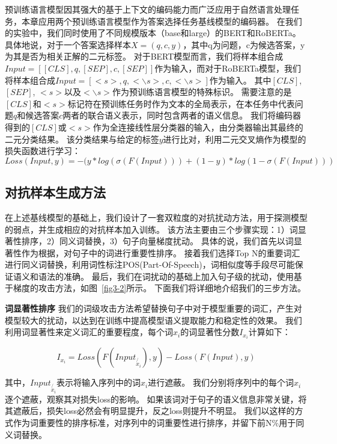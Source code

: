 预训练语言模型因其强大的基于上下文的编码能力而广泛应用于自然语言处理任务，本章应用两个预训练语言模型作为答案选择任务基线模型的编码器。
在我们的实验中，我们同时使用了不同规模版本（base和large）的BERT\cite{devlin2018bert}和RoBERTa\cite{liu2019roberta}。
具体地说，对于一个答案选择样本$X=(q, c, y)$，其中q为问题，c为候选答案，y为其是否为相关正解的二元标签。
对于BERT模型而言，我们将样本组合成$Input = [[CLS], q, [SEP], c, [SEP]]$作为输入，而对于RoBERTa模型，我们将样本组合成$Input = [<s>, q, <\backslash s>, c, <\backslash s>]$作为输入。
其中$[CLS]$, $[SEP]$, $<s>$以及$<\backslash s>$作为预训练语言模型的特殊标识。
需要注意的是$[CLS]$和$<s>$标记符在预训练任务时作为文本的全局表示，在本任务中代表问题$q$和候选答案$c$两者的联合语义表示，同时包含两者的语义信息。
我们将编码器得到的$[CLS]$或$<s>$作为全连接线性层分类器的输入，由分类器输出其最终的二元分类结果。
该分类结果与给定的标签$y$进行比对，利用二元交叉熵作为模型的损失函数进行学习：
\begin{equation}
    Loss(Input, y) = -(y * log(\sigma(F(Input))) + (1 - y) * log(1 - \sigma(F(Input)))
\end{equation}


\subsection{对抗样本生成方法}
在上述基线模型的基础上，我们设计了一套双粒度的对抗扰动方法，用于探测模型的弱点，并生成相应的对抗样本加入训练。
该方法主要由三个步骤实现：1）词显著性排序，2）同义词替换，3）句子向量梯度扰动。
具体的说，我们首先以词显著性作为根据，对句子中的词进行重要性排序。
接着我们选择Top N的重要词汇进行同义词替换，利用词性标注POS(Part-Of-Speech)，词相似度等手段尽可能保证语义和语法的准确。
最后，我们在词扰动的基础上加入句子级的扰动，使用基于梯度的攻击方法，如图~\ref{fig3-2}所示。
下面我们将详细地介绍我们的三步方法。




\textbf{词显著性排序} 我们的词级攻击方法希望替换句子中对于模型重要的词汇，产生对模型较大的扰动，以达到在训练中提高模型语义提取能力和稳定性的效果。
我们利用词显著性来定义词汇的重要程度，每个词$x_i$的词显著性分数$I_{x_i}$计算如下：

\begin{equation}
    I_{x_i} = Loss(F(Input_{\not {x_i}}), y) - Loss(F(Input), y)
\end{equation}

其中，$Input_{\not {x_i}}$表示将输入序列中的词$x_i$进行遮蔽。
我们分别将序列中的每个词$x_i$逐个遮蔽，观察其对损失loss的影响。
如果该词对于句子的语义信息非常关键，将其遮蔽后，损失loss必然会有明显提升，反之loss则提升不明显。
我们以这样的方式作为词重要性的排序标准，对序列中的词重要性进行排序，并留下前N\%用于同义词替换。


